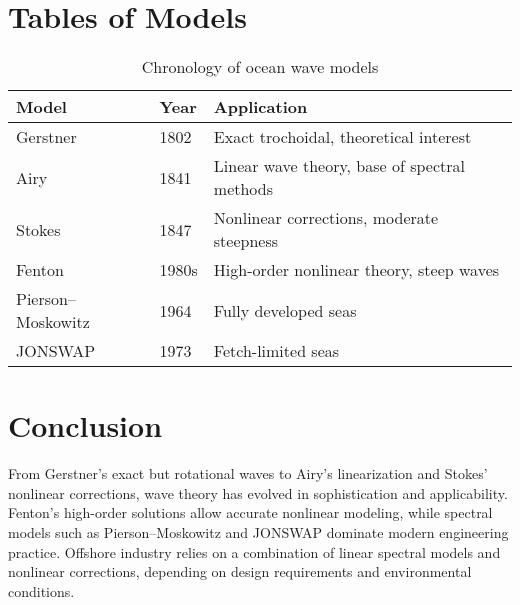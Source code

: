 \documentclass[11pt,a4paper]{article}
\begin{document}
\section{Tables of Models}
\begin{table}[h!]
\centering
\begin{tabular}{@{}lll@{}}
\toprule
Model & Year & Application \\ \midrule
Gerstner & 1802 & Exact trochoidal, theoretical interest \\
Airy & 1841 & Linear wave theory, base of spectral methods \\
Stokes & 1847 & Nonlinear corrections, moderate steepness \\
Fenton & 1980s & High-order nonlinear theory, steep waves \\
Pierson--Moskowitz & 1964 & Fully developed seas \\
JONSWAP & 1973 & Fetch-limited seas \\
\bottomrule
\end{tabular}
\caption{Chronology of ocean wave models}
\end{table}

\section{Conclusion}
From Gerstner’s exact but rotational waves to Airy’s linearization and Stokes’ nonlinear corrections, wave theory has evolved in sophistication and applicability. Fenton’s high-order solutions allow accurate nonlinear modeling, while spectral models such as Pierson–Moskowitz and JONSWAP dominate modern engineering practice. Offshore industry relies on a combination of linear spectral models and nonlinear corrections, depending on design requirements and environmental conditions.
\end{document}
